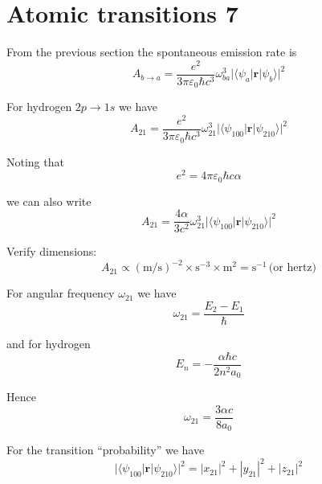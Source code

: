 

\section*{Atomic transitions 7}

From the previous section the spontaneous emission rate is
\begin{equation*}
A_{b\rightarrow a}=\frac{e^2}{3\pi\varepsilon_0\hbar c^3}\omega_{ba}^3
\bigl|\langle\psi_a|\mathbf r|\psi_b\rangle\bigr|^2
\end{equation*}

For hydrogen $2p\rightarrow1s$ we have
\begin{equation*}
A_{21}=\frac{e^2}{3\pi\varepsilon_0\hbar c^3}\omega_{21}^3
\bigl|\langle\psi_{100}|\mathbf r|\psi_{210}\rangle\bigr|^2
\end{equation*}

Noting that
\begin{equation*}
e^2=4\pi\varepsilon_0\hbar c\alpha
\end{equation*}

we can also write
\begin{equation*}
A_{21}=\frac{4\alpha}{3c^2}\omega_{21}^3
\bigl|\langle\psi_{100}|\mathbf r|\psi_{210}\rangle\bigr|^2
\tag{1}
\end{equation*}

Verify dimensions:
\begin{equation*}
A_{21}\propto(\text{m/s})^{-2}\times\text{s}^{-3}\times\text{m}^2=\text{s}^{-1}\,\text{(or hertz)}
\end{equation*}

For angular frequency $\omega_{21}$ we have
\begin{equation*}
\omega_{21}=\frac{E_2-E_1}{\hbar}
\end{equation*}

and for hydrogen
\begin{equation*}
E_n=-\frac{\alpha\hbar c}{2n^2a_0}
\end{equation*}

Hence
\begin{equation*}
\omega_{21}=\frac{3\alpha c}{8a_0}
\end{equation*}

For the transition ``probability'' we have
\begin{equation*}
\bigl|\langle\psi_{100}|\mathbf r|\psi_{210}\rangle\bigr|^2
=|x_{21}|^2+|y_{21}|^2+|z_{21}|^2
\end{equation*}

